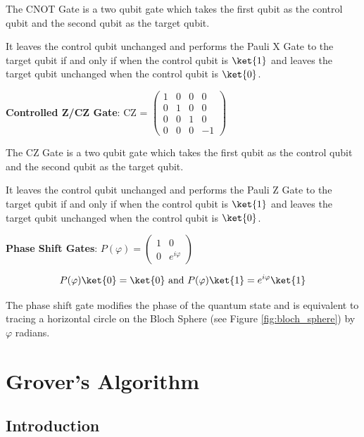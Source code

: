 \documentclass{article}
\begin{document}
\noindent
The CNOT Gate is a two qubit gate which takes the first qubit as the control qubit and the second qubit as the target qubit.
\vspace{5mm}

\noindent
It leaves the control qubit unchanged and performs the Pauli X Gate to the target qubit if and only if when the control qubit is $\ket{1}$ and leaves the target qubit unchanged when the control qubit is $\ket{0}$.
\vspace{5mm}

\textbf{Controlled Z/CZ Gate}: \qquad CZ = $\begin{pmatrix} 1 & 0 & 0 & 0 \\ 0 & 1 & 0 & 0 \\ 0 & 0 & 1 & 0 \\ 0 & 0 & 0 & -1 \end{pmatrix}$
\vspace{5mm}

\noindent
The CZ Gate is a two qubit gate which takes the first qubit as the control qubit and the second qubit as the target qubit.
\vspace{5mm}

\noindent
It leaves the control qubit unchanged and performs the Pauli Z Gate to the target qubit if and only if when the control qubit is $\ket{1}$ and leaves the target qubit unchanged when the control qubit is $\ket{0}$.
\pagebreak

\textbf{Phase Shift Gates}: \qquad $ P(\varphi) = \begin{pmatrix} 1 & 0 \\ 0 & e^{i\varphi} \end{pmatrix}$ 
\vspace{5mm}

\begin{equation}
P(\varphi)\ket{0} = \ket{0} \ \text{and} \ P(\varphi)\ket{1} = e^{i\varphi}\ket{1} 
\end{equation}

\noindent
The phase shift gate modifies the phase of the quantum state and is equivalent to tracing a horizontal circle on the Bloch Sphere (see Figure \ref{fig:bloch_sphere}) by $\varphi$ radians\cite{noauthor_quantum_nodate}. 

\pagebreak

\section{Grover's Algorithm}
\subsection{Introduction}
\end{document}
